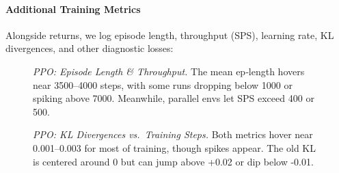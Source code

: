 \paragraph{Additional Training Metrics}
Alongside returns, we log episode length, throughput (SPS), learning rate, KL divergences, and other diagnostic losses:

\begin{figure} 
	\centering
	\quad
	\caption{\emph{PPO: Episode Length \& Throughput.}
		The mean ep‐length hovers near 3500--4000 steps, 
		with some runs dropping below 1000 or spiking above 7000. 
		Meanwhile, parallel envs let SPS exceed 400 or 500.}
	\label{fig:ppo_epilen_sps}
\end{figure}

\begin{figure} 
	\centering
	\quad
	\caption{\emph{PPO: KL Divergences vs.\ Training Steps.}
		Both metrics hover near 0.001--0.003 for most of training, 
		though spikes appear. The old KL is centered around 0 but can jump above +0.02 or dip below -0.01.}
	\label{fig:ppo_bothkl}
\end{figure}

